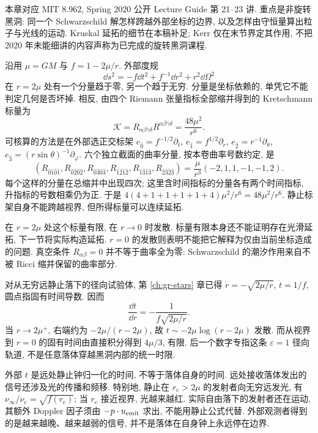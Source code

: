 \label{ch:gr-blackholes}

本章对应 MIT 8.962, Spring 2020 公开 Lecture Guide 第 21--23 讲. 重点是非旋转黑洞: 同一个 Schwarzschild 解怎样跨越外部坐标的边界, 以及怎样由守恒量算出粒子与光线的运动. Kruskal 延拓的细节在本稿补足; Kerr 仅在末节界定其作用, 不把 2020 年未能细讲的内容声称为已完成的旋转黑洞课程.


沿用 $\mu=GM$ 与 $f=1-2\mu/r$. 外部度规
\[
 \dd s^2=-f\dd t^2+f^{-1}\dd r^2+r^2\dd\Omega^2
\]
在 $r=2\mu$ 处有一个分量趋于零, 另一个趋于无穷. 分量是坐标依赖的, 单凭它不能判定几何是否坏掉. 相反, 由四个 Riemann 张量指标全部缩并得到的 Kretschmann 标量为
\begin{equation}
 \mathcal K=R_{\alpha\beta\gamma\delta}R^{\alpha\beta\gamma\delta}
            =\frac{48\mu^2}{r^6}.
 \label{eq:gr-kretschmann}
\end{equation}
可核算的方法是在外部选正交标架 $e_{\hat0}=f^{-1/2}\partial_t$, $e_{\hat1}=f^{1/2}\partial_r$, $e_{\hat2}=r^{-1}\partial_\theta$, $e_{\hat3}=(r\sin\theta)^{-1}\partial_\varphi$. 六个独立截面的曲率分量, 按本卷曲率号数约定, 是
\[
 (R_{\hat0\hat1\hat0\hat1},R_{\hat0\hat2\hat0\hat2},R_{\hat0\hat3\hat0\hat3},
 R_{\hat1\hat2\hat1\hat2},R_{\hat1\hat3\hat1\hat3},R_{\hat2\hat3\hat2\hat3})
 =\frac\mu{r^3}(-2,1,1,-1,-1,2).
\]
每个这样的分量在总缩并中出现四次; 这里含时间指标的分量各有两个时间指标, 升指标的号数相乘仍为正. 于是 $4(4+1+1+1+1+4)\mu^2/r^6=48\mu^2/r^6$. 静止标架自身不能跨越视界, 但所得标量可以连续延拓.

在 $r=2\mu$ 处这个标量有限, 在 $r\to0$ 时发散. 标量有限本身还不能证明存在光滑延拓, 下一节将实际构造延拓. $r=0$ 的发散则表明不能把它解释为仅由当前坐标造成的问题. 真空条件 $R_{\alpha\beta}=0$ 并不等于曲率全为零: Schwarzschild 的潮汐作用来自不被 Ricci 缩并保留的曲率部分.


对从无穷远静止落下的径向试验体, 第 \ref{ch:gr-stars} 章已得 $\dot r=-\sqrt{2\mu/r}$, $\dot t=1/f$, 圆点指固有时间导数. 因而
\[
 \frac{\dd t}{\dd r}=-\frac1{f\sqrt{2\mu/r}}.
\]
当 $r\to2\mu^+$, 右端约为 $-2\mu/(r-2\mu)$, 故 $t\sim-2\mu\log(r-2\mu)$ 发散. 而从视界到 $r=0$ 的固有时间由直接积分得到 $4\mu/3$, 有限. 后一个数字专指这条 $\varepsilon=1$ 径向轨道, 不是任意落体穿越黑洞内部的统一时限.

外部 $t$ 是远处静止钟归一化的时间, 不等于落体自身的时间. 远处接收落体发出的信号还涉及光的传播和频移. 特别地, 静止在 $r_e>2\mu$ 的发射者向无穷远发光, 有 $\nu_\infty/\nu_e=\sqrt{f(r_e)}$; 当 $r_e$ 接近视界, 光越来越红. 实际自由落下的发射者还在运动, 其额外 Doppler 因子须由 $-p\cdot u_{\rm emit}$ 求出, 不能用静止公式代替. 外部观测者得到的是越来越晚、越来越弱的信号, 并不是落体在自身钟上永远停在边界.

